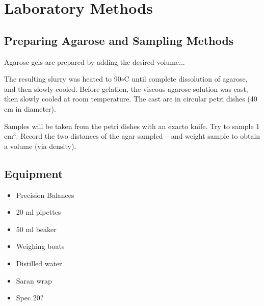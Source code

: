 \documentclass{article}
\begin{document}
\section{Laboratory Methods}

\subsection{Preparing Agarose and Sampling Methods}

Agarose gels are prepared by adding the desired volume... 

The resulting slurry was heated to 90$\circ$C until complete dissolution of agarose, and then slowly cooled. Before gelation, the viscous agarose solution was cast, then slowly cooled at room temperature. The cast are in circular petri dishes (40 cm in diameter).





Samples will be taken from the petri dishes with an exacto knife. Try to sample 1 cm$^3$. Record the two distances of the agar sampled -- and weight sample to obtain a volume (via density).

\subsection{Equipment}
 
\begin{itemize}
	\item Precision Balances
	\item 20 ml pipettes
	\item 50 ml beaker
	\item	Weighing boats
	\item	Distilled water
	\item Saran wrap
	\item Spec 20?
\end{itemize}
	
\end{document}

